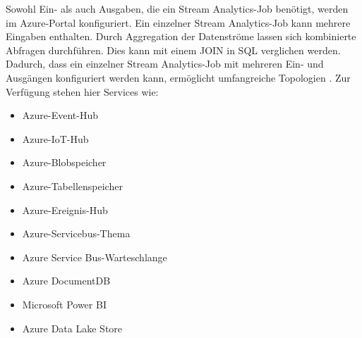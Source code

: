 Sowohl Ein- als auch Ausgaben, die ein Stream Analytics-Job benötigt, werden im Azure-Portal konfiguriert. Ein einzelner Stream Analytics-Job kann mehrere Eingaben enthalten. Durch Aggregation der Datenströme lassen sich kombinierte Abfragen durchführen. Dies kann mit einem JOIN in SQL verglichen werden. Dadurch, dass ein einzelner Stream Analytics-Job mit mehreren Ein- und Ausgängen konfiguriert werden kann, ermöglicht umfangreiche Topologien \cite{Prosise.}. Zur Verfügung stehen hier Services wie:
\begin{itemize}
	\item Azure-Event-Hub
	\item Azure-IoT-Hub
	\item Azure-Blobspeicher 
	\item Azure-Tabellenspeicher 
	\item Azure-Ereignis-Hub 
	\item Azure-Servicebus-Thema 
	\item Azure Service Bus-Warteschlange 
	\item Azure DocumentDB 
	\item Microsoft Power BI 
	\item Azure Data Lake Store 
\end{itemize} 